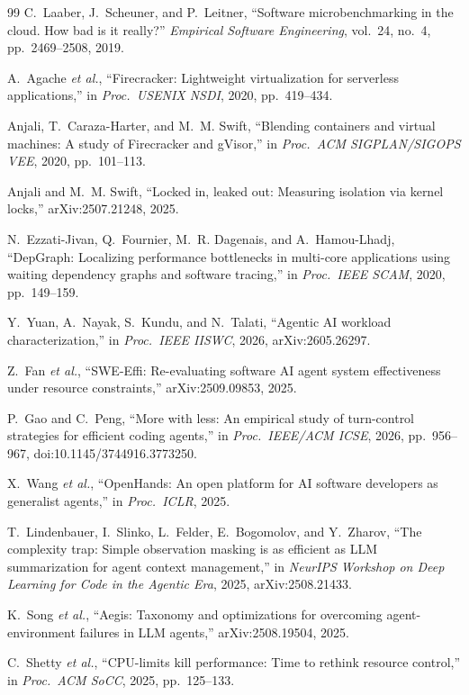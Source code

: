 \begin{thebibliography}{99}
C.~Laaber, J.~Scheuner, and P.~Leitner, ``Software microbenchmarking in the
cloud. How bad is it really?'' \emph{Empirical Software Engineering},
vol.~24, no.~4, pp.\ 2469--2508, 2019.

A.~Agache \emph{et al.}, ``Firecracker: Lightweight virtualization for
serverless applications,'' in \emph{Proc.\ USENIX NSDI}, 2020, pp.\ 419--434.

Anjali, T.~Caraza-Harter, and M.~M. Swift, ``Blending containers and virtual
machines: A study of Firecracker and gVisor,'' in \emph{Proc.\ ACM SIGPLAN/SIGOPS
VEE}, 2020, pp.\ 101--113.

Anjali and M.~M. Swift, ``Locked in, leaked out: Measuring isolation via
kernel locks,'' arXiv:2507.21248, 2025.

N.~Ezzati-Jivan, Q.~Fournier, M.~R. Dagenais, and A.~Hamou-Lhadj, ``DepGraph:
Localizing performance bottlenecks in multi-core applications using waiting
dependency graphs and software tracing,'' in \emph{Proc.\ IEEE SCAM}, 2020,
pp.\ 149--159.

Y.~Yuan, A.~Nayak, S.~Kundu, and N.~Talati, ``Agentic AI workload
characterization,'' in \emph{Proc.\ IEEE IISWC}, 2026, arXiv:2605.26297.

Z.~Fan \emph{et al.}, ``SWE-Effi: Re-evaluating software AI agent system
effectiveness under resource constraints,'' arXiv:2509.09853, 2025.

P.~Gao and C.~Peng, ``More with less: An empirical study of turn-control
strategies for efficient coding agents,'' in \emph{Proc.\ IEEE/ACM ICSE}, 2026,
pp.\ 956--967, doi:10.1145/3744916.3773250.

X.~Wang \emph{et al.}, ``OpenHands: An open platform for AI software
developers as generalist agents,'' in \emph{Proc.\ ICLR}, 2025.

T.~Lindenbauer, I.~Slinko, L.~Felder, E.~Bogomolov, and Y.~Zharov, ``The
complexity trap: Simple observation masking is as efficient as LLM
summarization for agent context management,'' in \emph{NeurIPS Workshop on
Deep Learning for Code in the Agentic Era}, 2025, arXiv:2508.21433.

K.~Song \emph{et al.}, ``Aegis: Taxonomy and optimizations for overcoming
agent-environment failures in LLM agents,'' arXiv:2508.19504, 2025.

C.~Shetty \emph{et al.}, ``CPU-limits kill performance: Time to rethink
resource control,'' in \emph{Proc.\ ACM SoCC}, 2025, pp.\ 125--133.


\end{thebibliography}
